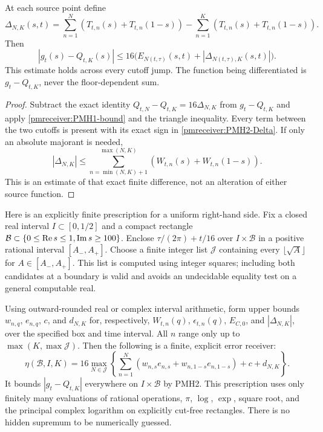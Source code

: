 \documentclass[11pt]{article}
\begin{document}
\begin{pmreceivertheorem}
\label{pmreceiver:PMH2}
At each source point define
\begin{equation}\label{pmreceiver:PMH2-Delta}
 \Delta_{N,K}(s,t)=\sum_{n=1}^N
 (T_{t,n}(s)+T_{t,n}(1-s))-
 \sum_{n=1}^K(T_{t,n}(s)+T_{t,n}(1-s)).
\end{equation}
Then
\begin{equation}\label{pmreceiver:PMH2-bound}
 |g_t(s)-Q_{t,K}(s)|\le
 16\bigl(E_{N(t,\tau)}(s,t)+|\Delta_{N(t,\tau),K}(s,t)|\bigr).
\end{equation}
This estimate holds across every cutoff jump. The function being
differentiated is $g_t-Q_{t,K}$, never the floor-dependent sum.
\end{pmreceivertheorem}
\begin{proof}
Subtract the exact identity
$Q_{t,N}-Q_{t,K}=16\Delta_{N,K}$ from $g_t-Q_{t,K}$ and apply
\eqref{pmreceiver:PMH1-bound} and the triangle inequality. Every term between
the two cutoffs is present with its exact sign in
\eqref{pmreceiver:PMH2-Delta}. If only an absolute majorant is needed,
\[
 |\Delta_{N,K}|\le\sum_{n=\min(N,K)+1}^{\max(N,K)}
           (W_{t,n}(s)+W_{t,n}(1-s)).
\]
This is an estimate of that exact finite difference, not an alteration
of either source function.
\end{proof}

Here is an explicitly finite prescription for a uniform right-hand
side. Fix a closed real interval $I\subset[0,1/2]$ and a compact
rectangle $\mathcal B\subset\{0\le\operatorname{Re} s\le1,\operatorname{Im} s\ge100\}$.
Enclose $\tau/(2\pi)+t/16$ over $I\times\mathcal B$ in a positive
rational interval $[A_-,A_+]$. Choose a finite integer list
$\mathcal J$ containing every $\lfloor\sqrt A\rfloor$ for
$A\in[A_-,A_+]$. This list is computed using integer squares;
including both candidates at a boundary is valid and avoids an
undecidable equality test on a general computable real.

Using outward-rounded real or complex interval arithmetic, form
upper bounds $w_{n,q}$, $e_{n,q}$, $c$, and $d_{N,K}$ for,
respectively, $W_{t,n}(q)$, $\epsilon_{t,n}(q)$,
$E_{C,0}$, and $|\Delta_{N,K}|$, over the specified box and time
interval. All $n$ range only up to $\max(K,\max\mathcal J)$.
Then the following is a finite, explicit error receiver:
\begin{equation}\label{pmreceiver:PMH2-box}
 \eta(\mathcal B,I,K)=16\max_{N\in\mathcal J}
 \left\{\sum_{n=1}^N
 (w_{n,s}e_{n,s}+w_{n,1-s}e_{n,1-s})+c+d_{N,K}\right\}.
\end{equation}
It bounds $|g_t-Q_{t,K}|$ everywhere on $I\times\mathcal B$ by
PMH2. This prescription uses only finitely many evaluations of
rational operations, $\pi$, $\log$, $\exp$, square root, and the
principal complex logarithm on explicitly cut-free rectangles.
There is no hidden supremum to be numerically guessed.
\end{document}
